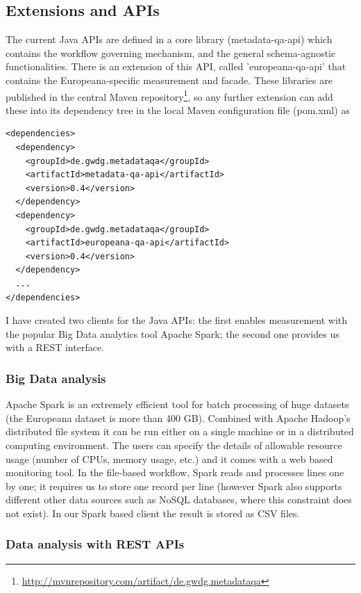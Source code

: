 \subsection{Extensions and APIs}

The current Java APIs are defined in a core library (metadata-qa-api) which contains the workflow governing mechanism, and the general schema-agnostic functionalities. There is an extension of this API, called 'europeana-qa-api' that contains the Europeana-specific measurement and facade. These libraries are published in the central Maven repository\footnote{\url{http://mvnrepository.com/artifact/de.gwdg.metadataqa}}, so any further extension can add these into its dependency tree in the local Maven configuration file (pom.xml) as

\begin{lstlisting}[caption=Including the Java libraries into other project]
<dependencies>
  <dependency>
    <groupId>de.gwdg.metadataqa</groupId>
    <artifactId>metadata-qa-api</artifactId>
    <version>0.4</version>
  </dependency>
  <dependency>
    <groupId>de.gwdg.metadataqa</groupId>
    <artifactId>europeana-qa-api</artifactId>
    <version>0.4</version>
  </dependency>
  ...
</dependencies>
\end{lstlisting}

I have created two clients for the Java APIs: the first enables measurement with the popular Big Data analytics tool Apache Spark; the second one provides us with a REST interface.

\subsubsection{Big Data analysis}

Apache Spark is an extremely efficient tool for batch processing of huge datasets (the Europeana dataset is more than 400 GB). Combined with Apache Hadoop's distributed file system it can be run either on a single machine or in a distributed computing environment. The users can specify the details of allowable resource usage (number of CPUs, memory usage, etc.) and it comes with a web based monitoring tool. In the file-based workflow, Spark reads and processes lines one by one; it requires us to store one record per line (however Spark also supports different other data sources such as NoSQL databases, where this constraint does not exist). In our Spark based client the result is stored as CSV files.

\subsubsection{Data analysis with REST APIs}

